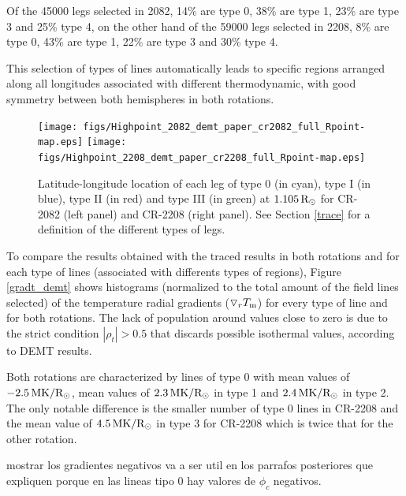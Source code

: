 \documentclass[namedreferences]{solarphysics}
\newcommand{\mrsun}{{\rm R_\odot}}
\newcommand{\dr}{\triangledown_r}
\newcommand{\Tm}{T_{\rm m}}
\def\temp#1{\textcolor{mygray}{#1}}
\begin{document}
\begin{article}
Of the 45000 legs selected in 2082, 14\% are type 0, 38\% are type 1, 23\% are type 3 and 25\% type 4, on the other hand of the 59000 legs selected in 2208, 8\% are type 0, 43\% are type 1, 22\% are type 3 and 30\% type 4.

This selection of types of lines automatically leads to specific regions arranged along all longitudes associated with different thermodynamic, with good symmetry between both hemispheres in both rotations.%


\begin{figure}[h!]
\begin{center}
\texttt{[image: figs/Highpoint\_2082\_demt\_paper\_cr2082\_full\_Rpoint-map.eps]}
\texttt{[image: figs/Highpoint\_2208\_demt\_paper\_cr2208\_full\_Rpoint-map.eps]}
\caption{Latitude-longitude location of each leg of type 0 (in cyan), type I (in blue), type II (in red) and type III (in green) at $1.105\,\mrsun$ for CR-2082 (left panel) and CR-2208 (right panel). See Section \ref{trace} for a definition of the different types of legs.}
\label{rpoint_demt}
\end{center}
\end{figure} 

To compare the results obtained with the traced results in both rotations and for each type of lines (associated with differents types of regions), Figure \ref{gradt_demt} shows histograms (normalized to the total amount of the field lines selected) of the temperature radial gradients ($\dr \Tm$) for every type of line and for both rotations. The lack of population around values close to zero is due to the strict condition $|\rho_t| > 0.5$ that discards possible isothermal values, according to DEMT results.

Both rotations are characterized by lines of type 0 with mean values of $-2.5\, \rm MK/\mrsun$, mean values of $2.3\, \rm MK/\mrsun$ in type 1 and $2.4\, \rm MK/\mrsun$ in type 2. The only notable difference is the smaller number of type 0 lines in CR-2208 and the mean value of $4.5\, \rm MK/\mrsun$ in type 3 for CR-2208 which is twice that for the other rotation.

\temp{mostrar los gradientes negativos va a ser util en los parrafos posteriores que expliquen porque en las lineas tipo 0 hay valores de $\phi_c$ negativos.} 


\end{article}
\end{document}
